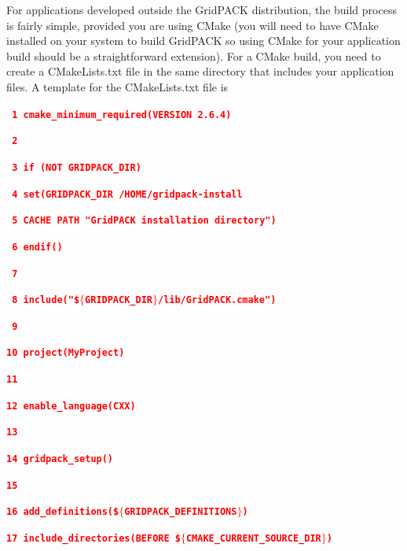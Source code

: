 \documentclass[12pt]{report} %
\begin{document}
For applications developed outside the GridPACK distribution, the build process is fairly simple, provided you are using CMake (you will need to have CMake installed on your system to build GridPACK so using CMake for your application build should be a straightforward extension). For a CMake build, you need to create a CMakeLists.txt file in the same directory that includes your application files. A template for the CMakeLists.txt file is

\textcolor{red}{\texttt{\textbf{ 1 cmake\_minimum\_required(VERSION 2.6.4)}}}

\textcolor{red}{\texttt{\textbf{ 2}}}

\textcolor{red}{\texttt{\textbf{ 3 if (NOT GRIDPACK\_DIR)}}}

\textcolor{red}{\texttt{\textbf{ 4   set(GRIDPACK\_DIR /HOME/gridpack-install}}}

\textcolor{red}{\texttt{\textbf{ 5       CACHE PATH "GridPACK installation directory")}}}

\textcolor{red}{\texttt{\textbf{ 6 endif()}}}

\textcolor{red}{\texttt{\textbf{ 7}}}

\textcolor{red}{\texttt{\textbf{ 8 include("\$$\boldsymbol{\mathrm{\{}}$GRIDPACK\_DIR$\boldsymbol{\mathrm{\}}}$/lib/GridPACK.cmake")}}}

\textcolor{red}{\texttt{\textbf{ 9}}}

\textcolor{red}{\texttt{\textbf{10 project(MyProject)}}}

\textcolor{red}{\texttt{\textbf{11}}}


\textcolor{red}{\texttt{\textbf{12 enable\_language(CXX)}}}

\textcolor{red}{\texttt{\textbf{13}}}


\textcolor{red}{\texttt{\textbf{14 gridpack\_setup()}}}

\textcolor{red}{\texttt{\textbf{15}}}

\textcolor{red}{\texttt{\textbf{16 add\_definitions(\$$\boldsymbol{\mathrm{\{}}$GRIDPACK\_DEFINITIONS$\boldsymbol{\mathrm{\}}}$)}}}


\textcolor{red}{\texttt{\textbf{17 include\_directories(BEFORE \$$\boldsymbol{\mathrm{\{}}$CMAKE\_CURRENT\_SOURCE\_DIR$\boldsymbol{\mathrm{\}}}$)}}}
\end{document}
